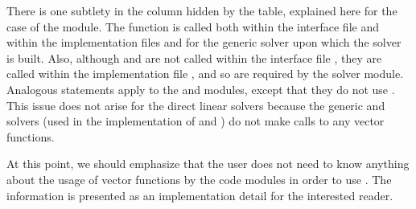 There is one subtlety in the {\kinspils} column hidden by the table, explained
here for the case of the {\kinspgmr} module. 
The  function is called both within the interface file
 and within the implementation
files  and  for the generic
{\spgmr} solver upon which the {\kinspgmr} solver is built.  Also, although
 and  are not called within the interface file
, they are called within the implementation file
, and so are required by the {\kinspgmr} solver module.
Analogous statements apply to the {\kinspbcg} and {\kinsptfqmr} modules,
except that they do not use .
This issue does not arise for the direct {\kinsol} linear solvers because
the generic {\dense} and {\band} solvers (used in the implementation of
{\kindense} and {\kinband}) do not make calls to any vector functions.

At this point, we should emphasize that the {\kinsol} user does not need to know 
anything about the usage of vector functions by the {\kinsol} code modules in order 
to use {\kinsol}. The information is presented as an implementation detail for the 
interested reader.

